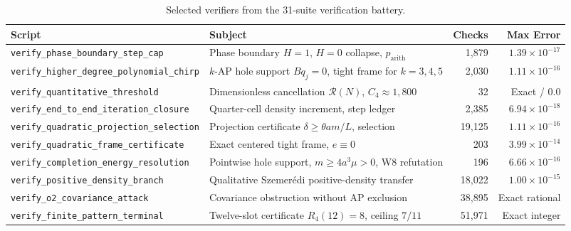 \documentclass[11pt,reqno]{amsart}
\theoremstyle{plain}
\theoremstyle{definition}
\begin{document}
\begin{table}[h]
\centering
\small
\begin{tabular}{llrr}
\toprule
Script & Subject & Checks & Max Error \\
\midrule
\texttt{verify\_phase\_boundary\_step\_cap} & Phase boundary $H=1$, $H=0$ collapse, $p_{\mathrm{arith}}$ & 1,879 & $1.39 \times 10^{-17}$ \\
\texttt{verify\_higher\_degree\_polynomial\_chirp} & $k$-AP hole support $Bq_j=0$, tight frame for $k=3,4,5$ & 2,030 & $1.11 \times 10^{-16}$ \\
\texttt{verify\_quantitative\_threshold} & Dimensionless cancellation $\mathcal{R}(N)$, $C_4 \approx 1,800$ & 32 & Exact / $0.0$ \\
\texttt{verify\_end\_to\_end\_iteration\_closure} & Quarter-cell density increment, step ledger & 2,385 & $6.94 \times 10^{-18}$ \\
\texttt{verify\_quadratic\_projection\_selection} & Projection certificate $\delta \ge \theta am/L$, selection & 19,125 & $1.11 \times 10^{-16}$ \\
\texttt{verify\_quadratic\_frame\_certificate} & Exact centered tight frame, $e \equiv 0$ & 203 & $3.99 \times 10^{-14}$ \\
\texttt{verify\_completion\_energy\_resolution} & Pointwise hole support, $m \ge 4a^3\mu > 0$, W8 refutation & 196 & $6.66 \times 10^{-16}$ \\
\texttt{verify\_positive\_density\_branch} & Qualitative Szemer\'edi positive-density transfer & 18,022 & $1.00 \times 10^{-15}$ \\
\texttt{verify\_o2\_covariance\_attack} & Covariance obstruction without AP exclusion & 38,895 & Exact rational \\
\texttt{verify\_finite\_pattern\_terminal} & Twelve-slot certificate $R_4(12)=8$, ceiling $7/11$ & 51,971 & Exact integer \\
\bottomrule
\end{tabular}
\caption{Selected verifiers from the 31-suite verification battery.}
\label{tab:verifiers}
\end{table}



\end{document}

